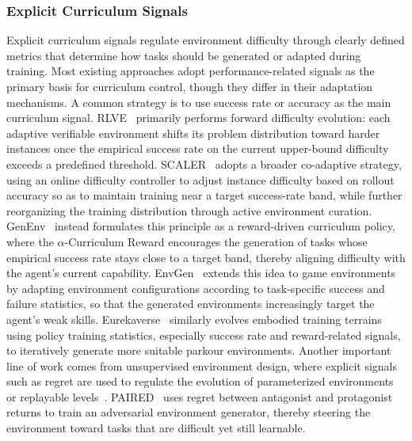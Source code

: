 \subsubsection{Explicit Curriculum Signals}\label{sec:Explicit Curriculum Signals}
Explicit curriculum signals regulate environment difficulty through clearly defined metrics that determine how tasks should be generated or adapted during training. 
%
Most existing approaches adopt performance-related signals as the primary basis for curriculum control, though they differ in their adaptation mechanisms.
%
A common strategy is to use success rate or accuracy as the main curriculum signal.
RLVE~\cite{RLVE} primarily performs forward difficulty evolution: each adaptive verifiable environment shifts its problem distribution toward harder instances once the empirical success rate on the current upper-bound difficulty exceeds a predefined threshold. 
SCALER~\cite{SCALER} adopts a broader co-adaptive strategy, using an online difficulty controller to adjust instance difficulty based on rollout accuracy so as to maintain training near a target success-rate band, while further reorganizing the training distribution through active environment curation. 
GenEnv~\cite{GenEnv} instead formulates this principle as a reward-driven curriculum policy, where the $\alpha$-Curriculum Reward encourages the generation of tasks whose empirical success rate stays close to a target band, thereby aligning difficulty with the agent's current capability.
EnvGen~\cite{EnvGen} extends this idea to game environments by adapting environment configurations according to task-specific success and failure statistics, so that the generated environments increasingly target the agent's weak skills.
Eurekaverse~\cite{Eurekaverse} similarly evolves embodied training terrains using policy training statistics, especially success rate and reward-related signals, to iteratively generate more suitable parkour environments.
%
Another important line of work comes from unsupervised environment design, where explicit signals such as regret are used to regulate the evolution of parameterized environments or replayable levels~\cite{PAIRED,DCD,MAESTRO,ACCEL,ReMiDi}.
PAIRED~\cite{PAIRED} uses regret between antagonist and protagonist returns to train an adversarial environment generator, thereby steering the environment toward tasks that are difficult yet still learnable.
